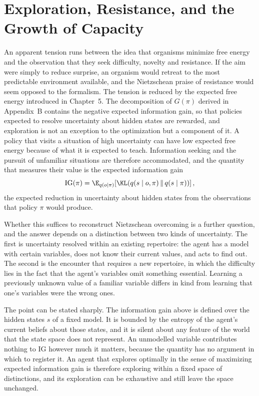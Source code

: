 \chapter{Exploration, Resistance, and the Growth of Capacity}

An apparent tension runs between the idea that organisms minimize free energy and the observation that they seek difficulty, novelty and resistance. If the aim were simply to reduce surprise, an organism would retreat to the most predictable environment available, and the Nietzschean praise of resistance would seem opposed to the formalism. The tension is reduced by the expected free energy introduced in Chapter~5. The decomposition of $G(\pi)$ derived in Appendix~B contains the negative expected information gain, so that policies expected to resolve uncertainty about hidden states are rewarded, and exploration is not an exception to the optimization but a component of it. A policy that visits a situation of high uncertainty can have low expected free energy because of what it is expected to teach. Information seeking and the pursuit of unfamiliar situations are therefore accommodated, and the quantity that measures their value is the expected information gain
\[
\mathrm{IG}(\pi)=\E_{q(o\mid\pi)}\!\left[\KL\!\left(q(s\mid o,\pi)\,\|\,q(s\mid\pi)\right)\right],
\]
the expected reduction in uncertainty about hidden states from the observations that policy $\pi$ would produce.

Whether this suffices to reconstruct Nietzschean overcoming is a further question, and the answer depends on a distinction between two kinds of uncertainty. The first is uncertainty resolved within an existing repertoire: the agent has a model with certain variables, does not know their current values, and acts to find out. The second is the encounter that requires a new repertoire, in which the difficulty lies in the fact that the agent's variables omit something essential. Learning a previously unknown value of a familiar variable differs in kind from learning that one's variables were the wrong ones.

The point can be stated sharply. The information gain above is defined over the hidden states $s$ of a fixed model. It is bounded by the entropy of the agent's current beliefs about those states, and it is silent about any feature of the world that the state space does not represent. An unmodelled variable contributes nothing to $\mathrm{IG}$ however much it matters, because the quantity has no argument in which to register it. An agent that explores optimally in the sense of maximizing expected information gain is therefore exploring within a fixed space of distinctions, and its exploration can be exhaustive and still leave the space unchanged.

